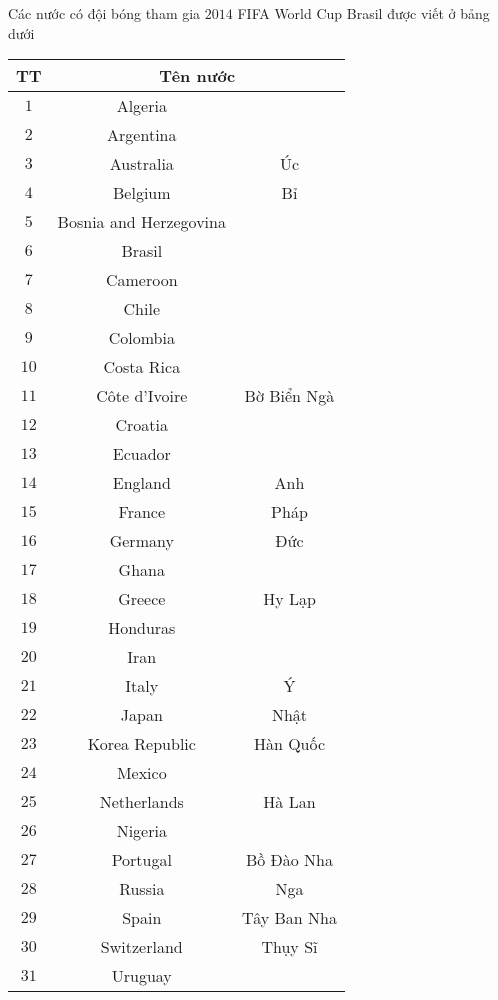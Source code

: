 \begin{vd}%
	Các nước có đội bóng tham gia $2014$ FIFA World Cup Brasil được viết ở bảng dưới
	\begin{center}
		\begin{tabular}{|c|c|c|}
			\hline
			TT &\multicolumn{2}{c|}{Tên nước}\\
			\hline
			$1$ &Algeria &\\
			\hline
			$2$ &Argentina &\\
			\hline
			$3$ &Australia &Úc\\
			\hline
			$4$ &Belgium &Bỉ\\
			\hline
			$5$ &Bosnia and Herzegovina &\\
			\hline
			$6$ &Brasil &\\
			\hline
			$7$ &Cameroon &\\
			\hline
			$8$ &Chile &\\
			\hline
			$9$ &Colombia &\\
			\hline
			$10$ &Costa Rica &\\
			\hline
			$11$ &Côte d'Ivoire &Bờ Biển Ngà\\
			\hline
			$12$ &Croatia &\\
			\hline
			$13$ &Ecuador &\\
			\hline
			$14$ &England &Anh\\
			\hline
			$15$ &France &Pháp\\
			\hline
			$16$ &Germany &Đức\\
			\hline
			$17$ &Ghana &\\
			\hline
			$18$ &Greece &Hy Lạp\\
			\hline
			$19$ &Honduras &\\
			\hline
			$20$ &Iran &\\
			\hline
			$21$ &Italy &Ý\\
			\hline
			$22$ &Japan &Nhật\\
			\hline
			$23$ &Korea Republic &Hàn Quốc\\
			\hline
			$24$ &Mexico &\\
			\hline
			$25$ &Netherlands &Hà Lan\\
			\hline
			$26$ &Nigeria &\\
			\hline
			$27$ &Portugal &Bồ Đào Nha\\
			\hline
			$28$ &Russia &Nga\\
			\hline
			$29$ &Spain &Tây Ban Nha\\
			\hline
			$30$ &Switzerland &Thụy Sĩ\\
			\hline
			$31$ &Uruguay &\\

\end{tabular}
\end{center}
\end{vd}
